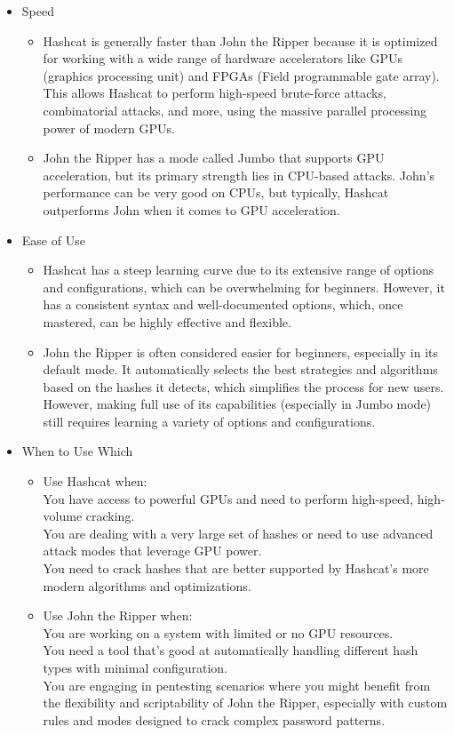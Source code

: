 \documentclass[10pt,oneside,english,a4paper]{article}
\begin{document}
\begin{itemize}
\item Speed
\begin{itemize}
\item Hashcat is generally faster than John the Ripper because it is optimized for working with a wide range of hardware accelerators like GPUs (graphics processing unit) and FPGAs (Field programmable gate array). This allows Hashcat to perform high-speed brute-force attacks, combinatorial attacks, and more, using the massive parallel processing power of modern GPUs.
\item John the Ripper has a mode called Jumbo that supports GPU acceleration, but its primary strength lies in CPU-based attacks. John's performance can be very good on CPUs, but typically, Hashcat outperforms John when it comes to GPU acceleration.
\end{itemize}

\item Ease of Use
\begin{itemize}
\item Hashcat has a steep learning curve due to its extensive range of options and configurations, which can be overwhelming for beginners. However, it has a consistent syntax and well-documented options, which, once mastered, can be highly effective and flexible.
\item John the Ripper is often considered easier for beginners, especially in its default mode. It automatically selects the best strategies and algorithms based on the hashes it detects, which simplifies the process for new users. However, making full use of its capabilities (especially in Jumbo mode) still requires learning a variety of options and configurations.
\end{itemize}

\item When to Use Which
\begin{itemize}
\item Use Hashcat when:\\
You have access to powerful GPUs and need to perform high-speed, high-volume cracking.\\
You are dealing with a very large set of hashes or need to use advanced attack modes that leverage GPU power.\\
You need to crack hashes that are better supported by Hashcat's more modern algorithms and optimizations.\\
\item Use John the Ripper when:\\
You are working on a system with limited or no GPU resources.\\
You need a tool that's good at automatically handling different hash types with minimal configuration.\\
You are engaging in pentesting scenarios where you might benefit from the flexibility and scriptability of John the Ripper, especially with custom rules and modes designed to crack complex password patterns.\\
\end{itemize}
\end{itemize}
\end{document}
